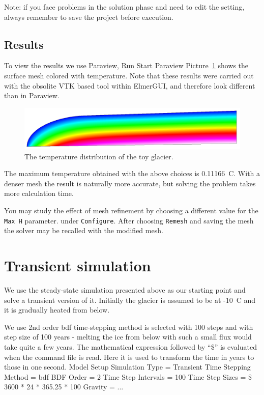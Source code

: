 Note: if you face problems in the solution phase and need to edit the setting, always remember to save
the project before execution.

\subsection*{Results}

To view the results we use Paraview,
\ttbegin
Run
  Start Paraview
\ttend
Picture~\ref{glac:figtemp} shows
the surface mesh colored with temperature.
Note that these results were carried out with the obsolite
VTK based tool within ElmerGUI, and therefore look different than in Paraview.

\begin{figure}
\begin{center}
\includegraphics[width=120mm]{glacier_toy_temp}
\caption{The temperature distribution of the toy glacier.}\label{glac:figtemp}
\end{center}
\end{figure}


The maximum temperature obtained with the above choices is 0.11166~C. 
With a denser mesh the result is
naturally more accurate, but solving the problem takes more calculation time.

You may study the effect of mesh refinement by choosing 
a different value for the \texttt{Max H} parameter.
under \texttt{Configure}. After choosing \texttt{Remesh} and saving the mesh 
the solver may be recalled with the modified mesh.


\section*{Transient simulation}

We use the steady-state simulation presented above as our starting point and 
solve a transient version of it. Initially the glacier is assumed to be at -10~C 
and it is gradually heated from below. 


We use 2nd order bdf time-stepping method is selected with 100 steps
and with step size of 100 years - melting the ice from below with such a small flux 
would take quite a few years. 
The mathematical expression followed 
by ``\$'' is evaluated when the command file is read.
Here it is used to transform the time in years to those in one second. 
\ttbegin
Model
  Setup 
    Simulation Type = Transient
    Time Stepping Method = bdf
    BDF Order = 2
    Time Step Intervals = 100
    Time Step Sizes = \$ 3600 * 24 * 365.25 * 100
    Gravity = ...
\ttend

